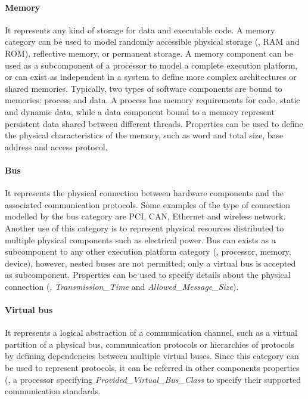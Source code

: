 \paragraph{Memory}  It represents any kind of storage for data and executable code. A memory category can be used to model randomly accessible physical storage (\eg, RAM and ROM), reflective memory, or permanent storage. A memory component can be used as a subcomponent of a processor to model a complete execution platform, or can exist as independent in a system to define more complex architectures or shared memories. Typically, two types of software components are bound to memories: process and data. A process has memory requirements for code, static and dynamic data, while a data component bound to a memory represent persistent data shared between different threads. Properties can be used to define the physical characteristics of the memory, such as word and total size, base address and access protocol.

\paragraph{Bus} It represents the physical connection between hardware components and the associated communication protocols. Some examples of the type of connection modelled by the bus category are PCI, CAN, Ethernet and wireless network. Another use of this category is to represent physical resources distributed to multiple physical components such as electrical power. Bus can exists as a subcomponent to any other execution platform category (\ie, processor, memory, device), however, nested buses are not permitted; only a virtual bus is accepted as subcomponent. Properties can be used to specify details about the physical connection (\eg, \textit{Transmission\_Time} and \textit{Allowed\_Message\_Size}).

\paragraph{Virtual bus} It represents a logical abstraction of a communication channel, such as a virtual partition of a physical bus, communication protocols or hierarchies of protocols by defining dependencies between multiple virtual buses. Since this category can be used to represent protocols, it can be referred in other components properties (\eg, a processor specifying \textit{Provided\_Virtual\_Bus\_Class} to specify their supported communication standards.

